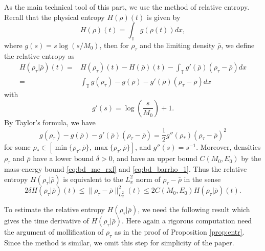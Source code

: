 \documentclass[leqno]{amsart}
\theoremstyle{plain}
\theoremstyle{definition}
\theoremstyle{remark}
\theoremstyle{plain}
\theoremstyle{plain}
\def\T{{\mathbb T}}%
\numberwithin{equation}{section}
\begin{document}
As the main technical tool of this part, we use the method of relative entropy. Recall that the physical entropy $H(\rho)(t)$ is given by
\[
H(\rho)(t)=\int_\T g(\rho(t))dx,
\]
where $g(s)=s \log(s/M_0)$, then for $\rho_\tau$ and the limiting density $\bar\rho$, we define the relative entropy as
\begin{equation}\label{eq:rl_entr}
\begin{aligned}
H(\rho_\tau|\bar\rho)(t)=&H(\rho_\tau)(t)-H(\bar\rho)(t)-\int_\T g'(\bar\rho)(\rho_\tau-\bar\rho)dx\\
=&\int_\T g(\rho_\tau)-g(\bar\rho)-g'(\bar\rho)(\rho_\tau-\bar\rho)dx
\end{aligned}
\end{equation} 
with
\[
g'(s)=\log\left(\frac{s}{M_0}\right)+1.
\]
By Taylor's formula, we have
\[
g(\rho_\tau)-g(\bar\rho)-g'(\bar\rho)(\rho_\tau-\bar\rho)=\frac12 g''(\rho_*)(\rho_\tau-\bar\rho)^2
\]
for some $\rho_*\in [\min\{\rho_\tau,\bar\rho\},\max\{\rho_\tau,\bar\rho\}]$, and $g''(s)=s^{-1}$. Moreover, densities $\rho_\tau$ and $\bar\rho$ have a lower bound $\delta>0$, and have an upper bound $C(M_0,E_0)$ by the mass-energy bound \eqref{eq:bd_me_rxl} and \eqref{eq:bd_barrho_1}. Thus the relative entropy $H(\rho_\tau|\bar\rho)$ is equivalent to the $L^2_x$ norm of $\rho_\tau-\bar\rho$ in the sense
\begin{equation}\label{eq:equiv_entr}
2 \delta H(\rho_\tau|\bar\rho)(t)\leq\|\rho_\tau-\bar\rho\|_{L^2_x}^2(t)\leq 2 C(M_0,E_0)H(\rho_\tau|\bar\rho)(t).
\end{equation}

To estimate the relative entropy $H(\rho_\tau|\bar\rho)$, we need the following result which gives the time derivative of $H(\rho_\tau|\bar\rho)$. Here again a rigorous computation need the argument of mollification of $\rho_\tau$ as in the proof of Proposition \ref{prop:entr}. Since the method is similar, we omit this step for simplicity of the paper.
\end{document}
